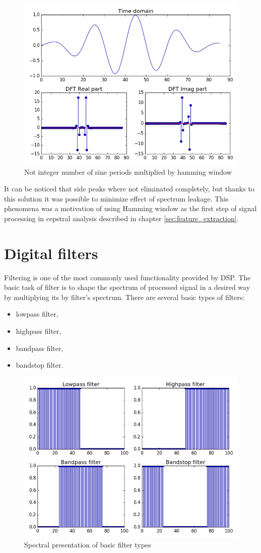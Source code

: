 \documentclass[magister]{dyplom}
\begin{document}
	\begin{figure} [!th]
		\centering
		\includegraphics[width=0.7\linewidth]{images/h_sub_sine}
		\caption{Not integer number of sine periods multiplied by hamming window}
		\label{fig:h_sub_sine}
	\end{figure}

	It can be noticed that side peaks where not eliminated completely, but thanks to this solution it was possible to minimize effect of spectrum leakage. This phenomena was a motivation of using Hamming window as the first step of signal processing in cepstral analysis described in chapter \ref{sec:feature_extraction}.
	
	\FloatBarrier
	
	\section{Digital filters}
	
	Filtering is one of the most commonly used functionality provided by \gls{DSP}. The basic task of filter is to shape the spectrum of processed signal in a desired way by multiplying its by filter's spectrum. There are several basic types of filters:
	
	\begin{itemize}
		\item lowpass filter,
		\item highpass filter,
		\item bandpass filter,
		\item bandstop filter.
	\end{itemize}
	
	\begin{figure}
		\centering
		\includegraphics[width=0.7\linewidth]{images/filters_spectrum}
		\caption{Spectral presentation of basic filter types}
		\label{fig:filters_spectrum}
	\end{figure}
	
\end{document}
